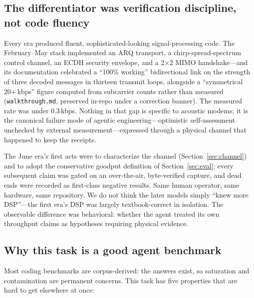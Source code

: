 \documentclass[11pt]{article}
\begin{document}
\subsection{The differentiator was verification discipline, not code fluency}

Every era produced fluent, sophisticated-looking signal-processing code. The
February--May stack implemented an ARQ transport, a chirp-spread-spectrum
control channel, an ECDH security envelope, and a 2$\times$2 MIMO
handshake---and its documentation celebrated a ``100\% working''
bidirectional link on the strength of three decoded messages in thirteen
transmit loops, alongside a ``symmetrical 20+\,kbps'' figure computed from
subcarrier counts rather than measured (\texttt{walkthrough.md}, preserved
in-repo under a correction banner). The measured rate was under 0.3\,kbps.
Nothing in that gap is specific to acoustic modems; it is the canonical
failure mode of agentic engineering---optimistic self-assessment unchecked
by external measurement---expressed through a physical channel that happened
to keep the receipts.

The June era's first acts were to characterize the channel
(Section~\ref{sec:channel}) and to adopt the conservative goodput definition
of Section~\ref{sec:eval}; every subsequent claim was gated on an
over-the-air, byte-verified capture, and dead ends were recorded as
first-class negative results. Same human operator, same hardware, same
repository. We do not think the later models simply ``knew more DSP''---the
first era's DSP was largely textbook-correct in isolation. The
observable difference was behavioral: whether the agent treated its own
throughput claims as hypotheses requiring physical evidence.

\subsection{Why this task is a good agent benchmark}

Most coding benchmarks are corpus-derived: the answers exist, so saturation
and contamination are permanent concerns. This task has five properties that
are hard to get elsewhere at once:
\end{document}
